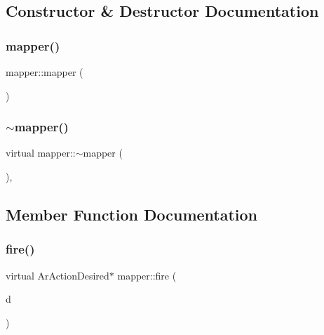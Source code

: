 \subsection{Constructor \& Destructor Documentation}
\mbox{\label{classmapper_a63253379db55193ffc58434c32657270}} 
\subsubsection{\texorpdfstring{mapper()}{mapper()}}
{\footnotesize\ttfamily mapper\+::mapper (\begin{DoxyParamCaption}{ }\end{DoxyParamCaption})}

\mbox{\label{classmapper_aab426a3eb8681cf2c1137f658a6802a4}} 
\subsubsection{\texorpdfstring{$\sim$mapper()}{~mapper()}}
{\footnotesize\ttfamily virtual mapper\+::$\sim$mapper (\begin{DoxyParamCaption}{ }\end{DoxyParamCaption})\hspace{0.3cm}{\ttfamily [inline]}, {\ttfamily [virtual]}}



\subsection{Member Function Documentation}
\mbox{\label{classmapper_a9d8bd0abf6844385c45d8b3ccd7b8e87}} 
\subsubsection{\texorpdfstring{fire()}{fire()}}
{\footnotesize\ttfamily virtual Ar\+Action\+Desired$\ast$ mapper\+::fire (\begin{DoxyParamCaption}\item[{Ar\+Action\+Desired}]{d }\end{DoxyParamCaption})\hspace{0.3cm}{\ttfamily [virtual]}}




